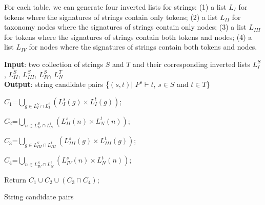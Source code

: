 For each table, we can generate four inverted lists for strings: (1) a list $L_I$ for tokens where the signatures of strings contain only tokens; (2) a list $L_{II}$ for taxonomy nodes where the signatures of strings contain only nodes; (3) a list $L_{III}$ for tokens where the signatures of strings contain both tokens and nodes; (4)  a list $L_{IV}$ for nodes where the signatures of strings contain both tokens and nodes.


\begin{algorithm}
{\bf Input}: two collection of strings $S$ and $T$ and their corresponding inverted lists $L_I^S$,  $L_{II}^S$, $L_{III}^S$, $L_{IV}^S$, $L_N^T$ \\
{\bf Output}: string candidate pairs \{$(s,t) |$  $P^s \vdash t$, $s \in S$ and $t \in T$\}
\begin{compactenum}[(1)]
\item  $C_1$=$\displaystyle\bigcup_{g \in L_I^S \cap L_I^t} (L_I^s(g) \times L_I^t(g)) $;
\item  $C_2$=$\displaystyle\bigcup_{n \in L_{II}^S \cap L_N^t} (L_{II}^s(n) \times L_N^t(n)) $;
\item  $C_3$=$\displaystyle\bigcup_{g \in L_{III}^S \cap L_{III}^t} (L_{III}^s(g) \times L_{III}^t(g)) $;
\item  $C_4$=$\displaystyle\bigcup_{n \in L_{IV}^S \cap L_N^t} (L_{IV}^s(n) \times L_N^t(n)) $;
\item   Return $C_1 \cup C_2 \cup (C_3 \cap C_4)$;

\end{compactenum}
\caption{String candidate pairs}
\label{alg:exactjoin}
\end{algorithm}

